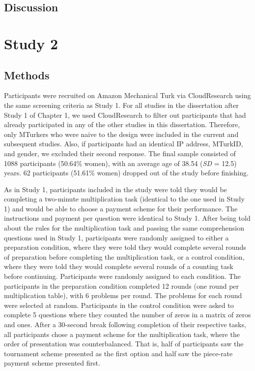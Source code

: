 \documentclass[a4paper, nobind]{templates/ociamthesis}
\begin{document}
\hypertarget{discussion}{%
\subsection{Discussion}\label{discussion}}

\hypertarget{study-2}{%
\section{Study 2}\label{study-2}}

\hypertarget{methods-1}{%
\subsection{Methods}\label{methods-1}}

Participants were recruited on Amazon Mechanical Turk via CloudResearch using the same screening criteria as Study 1. For all studies in the dissertation after Study 1 of Chapter 1, we used CloudResearch to filter out participants that had already participated in any of the other studies in this dissertation. Therefore, only MTurkers who were naive to the design were included in the current and subsequent studies. Also, if participants had an identical IP address, MTurkID, and gender, we excluded their second response. The final sample consisted of 1088 participants (50.64\% women), with an average age of 38.54 (\emph{SD} = 12.5) years. 62 participants (51.61\% women) dropped out of the study before finishing.

As in Study 1, participants included in the study were told they would be completing a two-minute multiplication task (identical to the one used in Study 1) and would be able to choose a payment scheme for their performance. The instructions and payment per question were identical to Study 1. After being told about the rules for the multiplication task and passing the same comprehension questions used in Study 1, participants were randomly assigned to either a preparation condition, where they were told they would complete several rounds of preparation before completing the multiplication task, or a control condition, where they were told they would complete several rounds of a counting task before continuing. Participants were randomly assigned to each condition. The participants in the preparation condition completed 12 rounds (one round per multiplication table), with 6 problems per round. The problems for each round were selected at random. Participants in the control condition were asked to complete 5 questions where they counted the number of zeros in a matrix of zeros and ones. After a 30-second break following completion of their respective tasks, all participants chose a payment scheme for the multiplication task, where the order of presentation was counterbalanced. That is, half of participants saw the tournament scheme presented as the first option and half saw the piece-rate payment scheme presented first.
\end{document}
